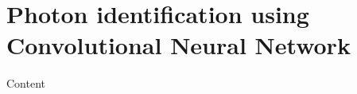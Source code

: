 \documentclass[10pt,aspectratio=169]{beamer}
\begin{document}




%

{
\begin{frame}
\end{frame}
}

\section{Photon identification using Convolutional Neural Network}

\begin{frame}{Content}
\label{content}
    \begin{columns}[t]
        \begin{column}{.5\textwidth}
            \tableofcontents[sections={1-5},currentsection]
        \end{column}
        \begin{column}{.5\textwidth}
            \tableofcontents[sections={6-},currentsection]
        \end{column}
    \end{columns}
\end{frame}
\end{document}
